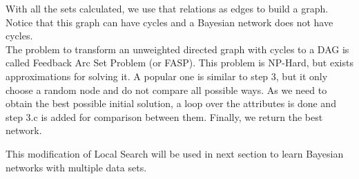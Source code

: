 With all the sets calculated, we use that relations as edges to build a graph. Notice that this graph can have cycles and a Bayesian network does not have cycles.\\
The problem to transform an unweighted directed graph with cycles to a DAG is called Feedback Arc Set Problem (or FASP). This problem is NP-Hard, but exists approximations for solving it. A popular one is similar to step 3, but it only choose a random node and do not compare all possible ways. As we need to obtain the best possible initial solution, a loop over the attributes is done and step 3.c is added for comparison between them. Finally, we return the best network.

This modification of Local Search will be used in next section to learn Bayesian networks with multiple data sets.